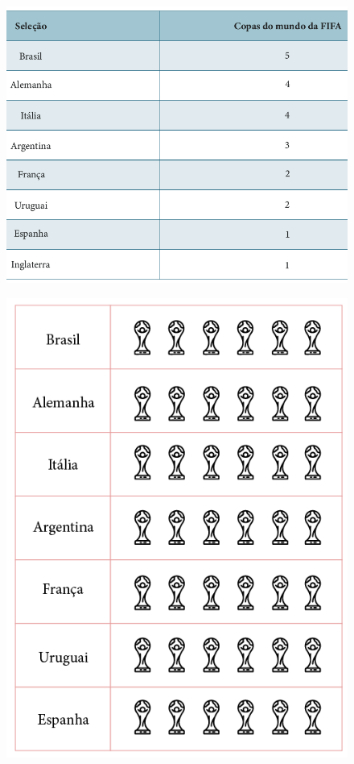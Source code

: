 \begin{figure}[H]
\centering
\includegraphics[width=.8\textwidth]{./media/SAEB_1ANO_MAT_FIGURA107.png}
\end{figure}

\pagebreak

\vspace{1cm}

\begin{figure}[H]
\centering
\includegraphics[width=\textwidth]{./media/SAEB_1ANO_MAT_FIGURA108.png}
\end{figure}

